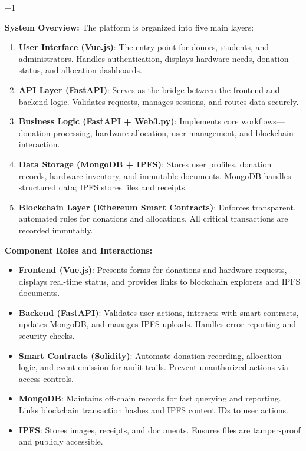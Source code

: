 +1\documentclass[conference]{IEEEtran}
\begin{document}
\textbf{System Overview:}
The platform is organized into five main layers:
\begin{enumerate}
    \item \textbf{User Interface (Vue.js)}: The entry point for donors, students, and administrators. Handles authentication, displays hardware needs, donation status, and allocation dashboards.
    \item \textbf{API Layer (FastAPI)}: Serves as the bridge between the frontend and backend logic. Validates requests, manages sessions, and routes data securely.
    \item \textbf{Business Logic (FastAPI + Web3.py)}: Implements core workflows—donation processing, hardware allocation, user management, and blockchain interaction.
    \item \textbf{Data Storage (MongoDB + IPFS)}: Stores user profiles, donation records, hardware inventory, and immutable documents. MongoDB handles structured data; IPFS stores files and receipts.
    \item \textbf{Blockchain Layer (Ethereum Smart Contracts)}: Enforces transparent, automated rules for donations and allocations. All critical transactions are recorded immutably.
\end{enumerate}

\textbf{Component Roles and Interactions:}
\begin{itemize}
    \item \textbf{Frontend (Vue.js)}: Presents forms for donations and hardware requests, displays real-time status, and provides links to blockchain explorers and IPFS documents.
    \item \textbf{Backend (FastAPI)}: Validates user actions, interacts with smart contracts, updates MongoDB, and manages IPFS uploads. Handles error reporting and security checks.
    \item \textbf{Smart Contracts (Solidity)}: Automate donation recording, allocation logic, and event emission for audit trails. Prevent unauthorized actions via access controls.
    \item \textbf{MongoDB}: Maintains off-chain records for fast querying and reporting. Links blockchain transaction hashes and IPFS content IDs to user actions.
    \item \textbf{IPFS}: Stores images, receipts, and documents. Ensures files are tamper-proof and publicly accessible.
\end{itemize}
\end{document}
